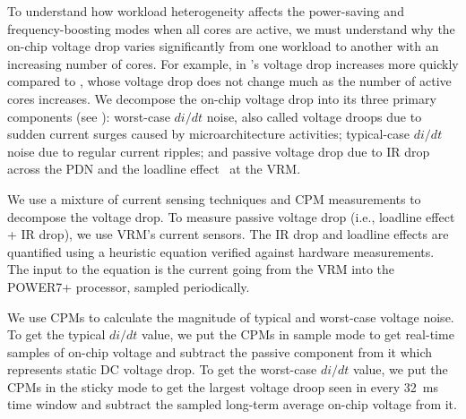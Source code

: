 To understand how workload heterogeneity affects the power-saving and frequency-boosting modes when all cores are active, we must understand why the on-chip voltage drop varies significantly from one workload to another with an increasing number of cores. For example, in  's voltage drop increases more quickly compared to , whose voltage drop does not change much as the number of active cores increases.  We decompose the on-chip voltage drop into its three primary components (see ): worst-case $di/dt$ noise, also called voltage droops due to sudden current surges caused by microarchitecture activities; typical-case $di/dt$ noise due to regular current ripples; and passive voltage drop due to IR drop across the PDN and the loadline effect~\cite{lefurgy2011active} at the VRM.

We use a mixture of current sensing techniques and CPM measurements to decompose the voltage drop. To measure passive voltage drop (i.e., loadline effect + IR drop), we use VRM's current sensors. The IR drop and loadline effects are quantified using a heuristic equation verified against hardware measurements. The input to the equation is the current going from the VRM into the POWER7+ processor, sampled periodically.

We use CPMs to calculate the magnitude of typical and worst-case voltage noise. To get the typical $di/dt$ value, we put the CPMs in sample mode to get real-time samples of on-chip voltage and subtract the passive component from it which represents static DC voltage drop. To get the worst-case $di/dt$ value, we put the CPMs in the sticky mode to get the largest voltage droop seen in every 32~ms time window and subtract the sampled long-term average on-chip voltage from it.

